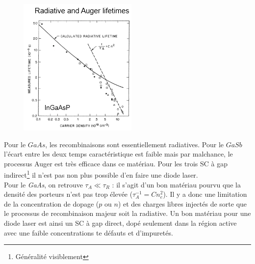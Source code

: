 	\begin{figure}
	\includegraphics[scale=0.8]{ch5/image33}
	\end{figure}
	Pour le $GaAs$, les recombinaisons sont essentiellement radiatives. Pour le $GaSb$ l'écart entre
	les deux temps caractéristique est faible mais par malchance, le processus Auger est très 
	efficace dans ce matériau. Pour les trois SC à gap indirect\footnote{Généralité visiblement} il
	n'est pas non plus possible d'en faire une diode laser.\\
	
	Pour le \textit{GaAs}, on retrouve $\tau_A\ll \tau_R$ : il s'agit d'un bon matériau 
	pourvu que la densité des porteurs n'est pas trop élevée ($\tau_A^{-1}=Cn_e^2$). 
	Il y a donc une limitation de la concentration de dopage ($p$ ou $n$) et des charges libres
	injectés de sorte que le processus de recombinaison majeur soit la radiative. Un bon matériau 
	pour une diode laser est ainsi un SC à gap direct, dopé seulement dans la région active avec 
	une faible concentrations te défauts et d'impuretés.
	
	
